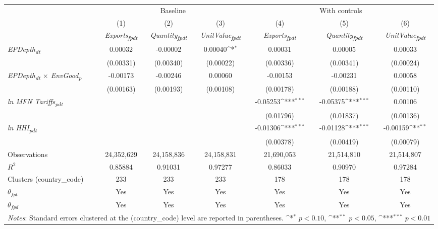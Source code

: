 {
\def\sym#1{\ifmmode^{#1}\else\(^{#1}\)\fi}
\begin{tabular}{l*{6}{c}}
\toprule
&\multicolumn{3}{c}{Baseline}&\multicolumn{3}{c}{With controls}\\\cmidrule(lr){2-4}\cmidrule(lr){5-7}
&(1)&(2)&(3)&(4)&(5)&(6)\\
&\textit{Exports\textsubscript{fpdt}}&\textit{Quantity\textsubscript{fpdt}}&\textit{UnitValue\textsubscript{fpdt}}&\textit{Exports\textsubscript{fpdt}}&\textit{Quantity\textsubscript{fpdt}}&\textit{UnitValue\textsubscript{fpdt}}\\
\midrule
\textit{EPDepth\textsubscript{dt}} & 0.00032 & -0.00002 & 0.00040\sym{*} & 0.00031 & 0.00005 & 0.00033\\
 & (0.00331) & (0.00340) & (0.00022) & (0.00336) & (0.00341) & (0.00024)\\
\addlinespace
\textit{EPDepth\textsubscript{dt} $\times$ EnvGood\textsubscript{p}} & -0.00173 & -0.00246 & 0.00060 & -0.00153 & -0.00231 & 0.00058\\
 & (0.00163) & (0.00193) & (0.00108) & (0.00178) & (0.00188) & (0.00110)\\
\addlinespace
\textit{ln MFN Tariffs\textsubscript{pdt}} &  &  &  & -0.05253\sym{***} & -0.05375\sym{***} & 0.00106\\
 &  &  &  & (0.01796) & (0.01837) & (0.00136)\\
\addlinespace
\textit{ln HHI\textsubscript{pdt}} &  &  &  & -0.01306\sym{***} & -0.01128\sym{***} & -0.00159\sym{**}\\
 &  &  &  & (0.00378) & (0.00419) & (0.00079)\\
\midrule
Observations & 24,352,629 & 24,158,836 & 24,158,831 & 21,690,053 & 21,514,810 & 21,514,807\\
$R^{2}$ & 0.85884 & 0.91031 & 0.97277 & 0.86033 & 0.90970 & 0.97284\\
Clusters (country_code) & 233 & 233 & 233 & 178 & 178 & 178\\
$\theta_{fpt}$ & Yes & Yes & Yes & Yes & Yes & Yes\\
$\theta_{fpd}$ & Yes & Yes & Yes & Yes & Yes & Yes\\
\bottomrule
\multicolumn{7}{l}{\footnotesize \textit{Notes}: Standard errors clustered at the (country_code) level are reported in parentheses. \sym{*} \(p<0.10\), \sym{**} \(p<0.05\), \sym{***} \(p<0.01\)}\\
\end{tabular}
}
